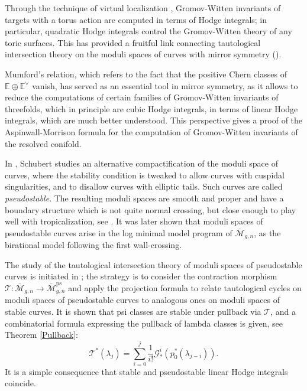 \documentclass[leqno,12pt]{amsart}
\theoremstyle{remark}
\numberwithin{equation}{section}
\DeclareMathOperator{\ps}{ps}
\begin{document}
Through the technique of virtual localization \cite{gp:virtloc}, Gromov-Witten invariants of  targets with a torus action are computed in terms of Hodge integrals; in particular,  quadratic Hodge integrals control the Gromov-Witten theory of any toric surfaces. This has provided a fruitful link connecting tautological intersection theory on the moduli spaces of curves with mirror symmetry (\cite{ck:mirror,clay:mirr}).

Mumford's relation, which refers to the fact that the positive Chern classes of $\mathbb{E}\oplus \mathbb{E}^\vee$ vanish, has served as an essential tool in mirror symmetry, as it allows to reduce the computations of certain families of Gromov-Witten invariants of threefolds, which in principle are cubic Hodge integrals,  in terms of linear Hodge integrals, which are much better understood. This perspective gives a proof of the Aspinwall-Morrison formula \cite{am:top, ele:am} for the computation of Gromov-Witten invariants of the resolved conifold.

In \cite{schubert1991new}, Schubert studies an alternative compactification of the moduli space of curves, where the stability condition is tweaked to allow curves with cuspidal singularities, and to disallow curves with elliptic tails. Such curves are called {\it pseudostable}. The resulting moduli spaces are smooth and proper and have a boundary structure which is not quite normal crossing, but close enough to play well with tropicalization, see \cite{CM:pseudo}. It was later shown \cite{HH} that moduli spaces of pseudostable curves arise in the log minimal model program of $\overline{\mathcal{M}}_{g,n}$, as the birational model following the first wall-crossing.

The study of the tautological intersection theory of moduli spaces of pseudostable curves is initiated in \cite{PSHI}; the strategy  is to
consider the contraction morphism $\mathcal{T}: \overline{\mathcal{M}}_{g, n} \rightarrow \overline{\mathcal{M}}^{\ps}_{g, n}$ and
apply the projection formula to relate tautological cycles on moduli spaces of pseudostable curves to analogous ones on moduli spaces of stable curves. 
It is shown that psi classes are stable under pullback via $\mathcal{T}$, and a combinatorial formula expressing the pullback of lambda classes is given, see Theorem \ref{Pullback}:
\begin{equation}\label{eq:pbla}
 \mathcal{T}^*(\lambda_j) = \sum_{i=0}^j \frac{1}{i!}\mathcal{G}_*^i(p_0^*(\lambda_{j-i})).   
\end{equation}
It is a simple consequence  that stable and pseudostable linear Hodge integrals coincide.
\end{document}
